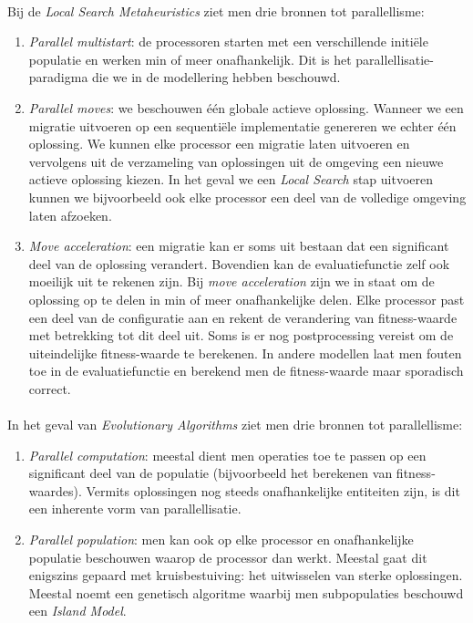 \paragraph{}
Bij de \emph{Local Search Metaheuristics} ziet men drie bronnen tot parallellisme:
\begin{enumerate}
 \item \emph{Parallel multistart}: de processoren starten met een verschillende initi\"ele populatie en werken min of meer onafhankelijk. Dit is het parallellisatie-paradigma die we in de modellering hebben beschouwd.
 \item \emph{Parallel moves}: we beschouwen \'e\'en globale actieve oplossing. Wanneer we een migratie uitvoeren op een sequenti\"ele implementatie genereren we echter \'e\'en oplossing. We kunnen elke processor een migratie laten uitvoeren en vervolgens uit de verzameling van oplossingen uit de omgeving een nieuwe actieve oplossing kiezen. In het geval we een \emph{Local Search} stap uitvoeren kunnen we bijvoorbeeld ook elke processor een deel van de volledige omgeving laten afzoeken.
 \item \emph{Move acceleration}: een migratie kan er soms uit bestaan dat een significant deel van de oplossing verandert. Bovendien kan de evaluatiefunctie zelf ook moeilijk uit te rekenen zijn. Bij \emph{move acceleration} zijn we in staat om de oplossing op te delen in min of meer onafhankelijke delen. Elke processor past een deel van de configuratie aan en rekent de verandering van fitness-waarde met betrekking tot dit deel uit. Soms is er nog postprocessing vereist om de uiteindelijke fitness-waarde te berekenen. In andere modellen laat men fouten toe in de evaluatiefunctie en berekend men de fitness-waarde maar sporadisch correct.
\end{enumerate}

\paragraph{}
In het geval van \emph{Evolutionary Algorithms} ziet men drie bronnen tot parallellisme:
\begin{enumerate}
 \item \emph{Parallel computation}: meestal dient men operaties toe te passen op een significant deel van de populatie (bijvoorbeeld het berekenen van fitness-waardes). Vermits oplossingen nog steeds onafhankelijke entiteiten zijn, is dit een inherente vorm van parallellisatie.
 \item \emph{Parallel population}: men kan ook op elke processor en onafhankelijke populatie beschouwen waarop de processor dan werkt. Meestal gaat dit enigszins gepaard met kruisbestuiving: het uitwisselen van sterke oplossingen. Meestal noemt een genetisch algoritme waarbij men subpopulaties beschouwd een \emph{Island Model}\cite{islandModel}.
\end{enumerate}


